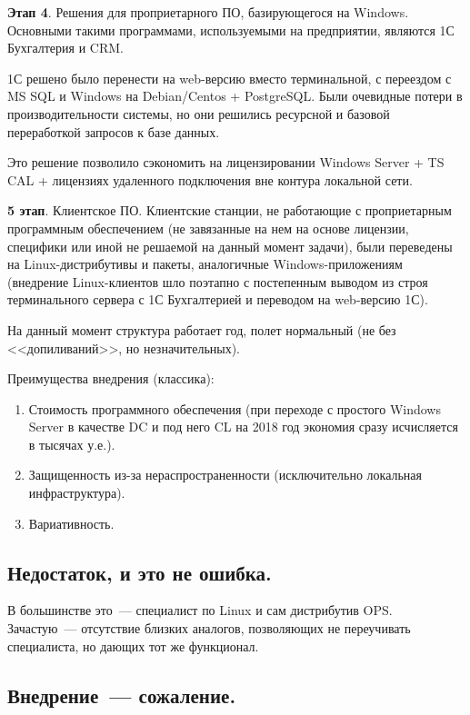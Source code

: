 \documentclass[10pt, a5paper]{article}
\begin{document}
\textbf{Этап 4}. Решения для проприетарного ПО, базирующегося на Windows.
Основными такими программами, используемыми на предприятии, являются 1С Бухгалтерия и CRM.

1С решено было перенести на web-версию вместо терминальной, с переездом с MS SQL и Windows на Debian/Centos + PostgreSQL. Были очевидные потери в производительности системы, но они решились ресурсной и базовой переработкой запросов к базе данных.

Это решение позволило сэкономить на лицензировании Windows Server + TS CAL + лицензиях удаленного подключения вне контура локальной сети.

\textbf{5 этап}. Клиентское ПО.
Клиентские станции, не работающие с проприетарным программным обеспечением (не завязанные на нем на основе лицензии, специфики или иной не решаемой на данный момент задачи), были переведены на Linux-дистрибутивы и пакеты, аналогичные Windows-приложениям (внедрение Linux-клиентов шло поэтапно с постепенным выводом из строя терминального сервера с 1С Бухгалтерией и переводом на web-версию 1С).

На данный момент структура работает год, полет нормальный (не без <<допиливаний>>, но незначительных).

Преимущества внедрения (классика):

\begin{enumerate}
  \item Стоимость программного обеспечения (при переходе с простого Windows Server в качестве DC и под него CL на 2018 год экономия сразу исчисляется в тысячах у.е.).
  \item Защищенность из-за нераспространенности (исключительно локальная инфраструктура).
  \item Вариативность.
\end{enumerate}

\subsection*{Недостаток, и это не ошибка.}

В большинстве это~--- специалист по Linux и сам дистрибутив OPS. Зачастую~--- отсутствие близких аналогов, позволяющих не переучивать специалиста, но дающих тот же функционал.

\subsection*{Внедрение~--- сожаление.}
\end{document}
